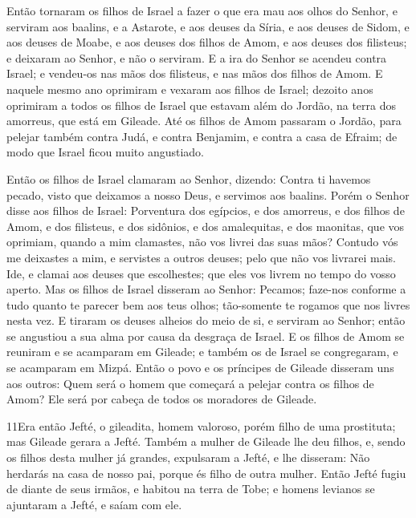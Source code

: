 Então tornaram os filhos de Israel a fazer o que era mau aos olhos
do Senhor, e serviram aos baalins, e a Astarote, e aos deuses da
Síria, e aos deuses de Sidom, e aos deuses de Moabe, e aos deuses
dos filhos de Amom, e aos deuses dos filisteus; e deixaram ao
Senhor, e não o serviram. E a ira do Senhor se acendeu contra
Israel; e vendeu-os nas mãos dos filisteus, e nas mãos dos filhos de
Amom. E naquele mesmo ano oprimiram e vexaram aos filhos de
Israel; dezoito anos oprimiram a todos os filhos de Israel que
estavam além do Jordão, na terra dos amorreus, que está em Gileade.
Até os filhos de Amom passaram o Jordão, para pelejar também
contra Judá, e contra Benjamim, e contra a casa de Efraim; de modo
que Israel ficou muito angustiado.

Então os filhos de Israel clamaram ao Senhor, dizendo: Contra ti
havemos pecado, visto que deixamos a nosso Deus, e servimos aos
baalins. Porém o Senhor disse aos filhos de Israel:
Porventura dos egípcios, e dos amorreus, e dos filhos de Amom, e dos
filisteus, e dos sidônios, e dos amalequitas, e dos maonitas,
que vos oprimiam, quando a mim clamastes, não vos livrei das suas
mãos? Contudo vós me deixastes a mim, e servistes a outros
deuses; pelo que não vos livrarei mais. Ide, e clamai aos
deuses que escolhestes; que eles vos livrem no tempo do vosso
aperto. Mas os filhos de Israel disseram ao Senhor: Pecamos;
faze-nos conforme a tudo quanto te parecer bem aos teus olhos;
tão-somente te rogamos que nos livres nesta vez. E tiraram os
deuses alheios do meio de si, e serviram ao Senhor; então se
angustiou a sua alma por causa da desgraça de Israel. E os
filhos de Amom se reuniram e se acamparam em Gileade; e também os de
Israel se congregaram, e se acamparam em Mizpá. Então o povo
e os príncipes de Gileade disseram uns aos outros: Quem será o homem
que começará a pelejar contra os filhos de Amom? Ele será por cabeça
de todos os moradores de Gileade.

\medskip

\lettrine{11} Era então Jefté, o gileadita, homem valoroso,
porém filho de uma prostituta; mas Gileade gerara a Jefté.
Também a mulher de Gileade lhe deu filhos, e, sendo os filhos
desta mulher já grandes, expulsaram a Jefté, e lhe disseram: Não
herdarás na casa de nosso pai, porque és filho de outra mulher.
Então Jefté fugiu de diante de seus irmãos, e habitou na terra
de Tobe; e homens levianos se ajuntaram a Jefté, e saíam com ele.


